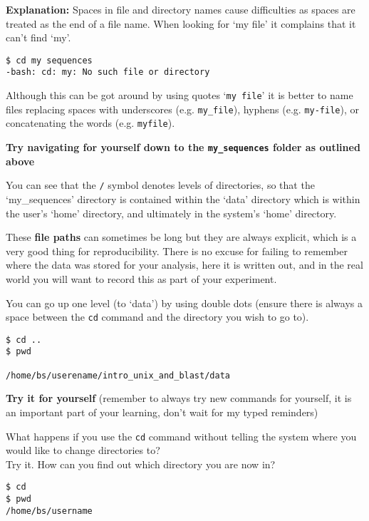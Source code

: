 \documentclass[11pt]{article}
\begin{document}
    \textbf{Explanation:} Spaces in file and directory names cause
difficulties as spaces are treated as the end of a file name. When
looking for `my file' it complains that it can't find `my'.

\begin{verbatim}
$ cd my sequences
-bash: cd: my: No such file or directory
\end{verbatim}

Although this can be got around by using quotes `\texttt{my\ file}' it
is better to name files replacing spaces with underscores (e.g.
\texttt{my\_file}), hyphens (e.g. \texttt{my-file}), or concatenating
the words (e.g. \texttt{myfile}).

    \textbf{Try navigating for yourself down to the \texttt{my\_sequences}
folder as outlined above}

    You can see that the \texttt{/} symbol denotes levels of directories, so
that the `my\_sequences' directory is contained within the `data'
directory which is within the user's `home' directory, and ultimately in
the system's `home' directory.

These \textbf{file paths} can sometimes be long but they are always
explicit, which is a very good thing for reproducibility. There is no
excuse for failing to remember where the data was stored for your
analysis, here it is written out, and in the real world you will want to
record this as part of your experiment.

You can go up one level (to `data') by using double dots (ensure there
is always a space between the \texttt{cd} command and the directory you
wish to go to).

\begin{verbatim}
$ cd ..
$ pwd

/home/bs/userename/intro_unix_and_blast/data
\end{verbatim}

\textbf{Try it for yourself} (remember to always try new commands for
yourself, it is an important part of your learning, don't wait for my
typed reminders)

    What happens if you use the \texttt{cd} command without telling the
system where you would like to change directories to?\\
Try it. How can you find out which directory you are now in?

\begin{verbatim}
$ cd 
$ pwd 
/home/bs/username
\end{verbatim}
\end{document}
